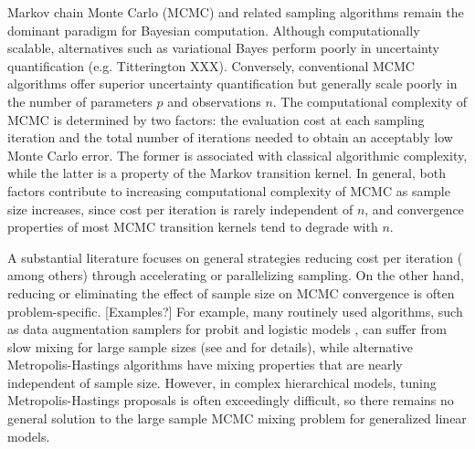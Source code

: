 \documentclass[10pt]{article}
\begin{document}
Markov chain Monte Carlo (MCMC) and related sampling algorithms remain the dominant paradigm for Bayesian computation. Although computationally scalable, alternatives such as variational Bayes perform poorly in uncertainty quantification (e.g. Titterington XXX). Conversely, conventional MCMC algorithms offer superior uncertainty quantification but generally scale poorly in the number of parameters $p$ and observations $n$. The computational complexity of MCMC is determined by two factors: the evaluation cost at each sampling iteration and the total number of iterations needed to obtain an acceptably low Monte Carlo error. The former is associated with classical algorithmic complexity, while the latter is a property of the Markov transition kernel. In general, both factors contribute to increasing computational complexity of MCMC as sample size increases, since cost per iteration is rarely independent of $n$, and convergence properties of most MCMC transition kernels tend to degrade with $n$.  %

A substantial literature focuses on general strategies reducing cost per iteration (\cite{minsker2014robust,srivastava2015wasp,conrad2015accelerating} among others) through accelerating or parallelizing sampling.  %
On the other hand, reducing or eliminating the effect of sample size on MCMC convergence is often problem-specific. [Examples?] For example, many routinely used algorithms, such as data augmentation samplers for probit \citep{albert1993bayesian} and logistic models \citep{polson2013bayesian}, can suffer from slow mixing for large sample sizes (see \cite{rajaratnam2015mcmc} and \cite{johndrow2016inefficiency} for details), while alternative Metropolis-Hastings algorithms have mixing properties that are nearly independent of sample size. However, in complex hierarchical models, tuning Metropolis-Hastings proposals is often exceedingly difficult, so there remains no general solution to the large sample MCMC mixing problem for generalized linear models.
\end{document}
